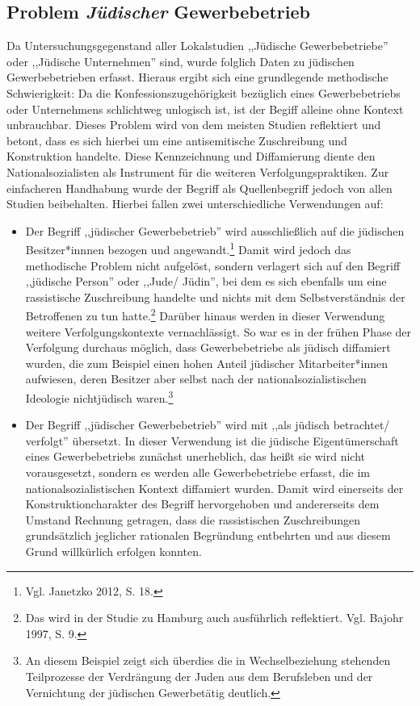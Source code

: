 \subsection{Problem \textit{Jüdischer} Gewerbebetrieb}

Da Untersuchungsgegenstand aller Lokalstudien ,,Jüdische Gewerbebetriebe'' oder ,,Jüdische Unternehmen'' sind, wurde folglich Daten zu jüdischen Gewerbebetrieben erfasst. Hieraus ergibt sich eine grundlegende methodische Schwierigkeit: Da die Konfessionszugehörigkeit bezüglich eines Gewerbebetriebs oder Unternehmens schlichtweg unlogisch ist, ist der Begiff alleine ohne Kontext unbrauchbar. Dieses Problem wird von dem meisten Studien reflektiert und betont, dass es sich hierbei um eine antisemitische Zuschreibung und Konstruktion handelte. Diese Kennzeichnung und Diffamierung diente den Nationalsozialisten als Instrument für die weiteren Verfolgungspraktiken. Zur einfacheren Handhabung wurde der Begriff als Quellenbegriff jedoch von allen Studien beibehalten. Hierbei fallen zwei unterschiedliche Verwendungen auf: 

\begin{itemize}
    \item Der Begriff ,,jüdischer Gewerbebetrieb'' wird ausschließlich auf die jüdischen Besitzer*innnen bezogen und angewandt.\footnote{Vgl. Janetzko 2012, S. 18.} Damit wird jedoch das methodische Problem nicht aufgelöst, sondern verlagert sich auf den Begriff ,,jüdische Person'' oder ,,Jude/ Jüdin'', bei dem es sich ebenfalls um eine rassistische Zuschreibung handelte und nichts mit dem Selbstverständnis der Betroffenen zu tun hatte.\footnote{Das wird in der Studie zu Hamburg auch ausführlich reflektiert. Vgl. Bajohr 1997, S. 9.} Darüber hinaus werden in dieser Verwendung weitere Verfolgungskontexte vernachlässigt. So war es in der frühen Phase der Verfolgung durchaus möglich, dass Gewerbebetriebe als jüdisch diffamiert wurden, die zum Beispiel einen hohen Anteil jüdischer Mitarbeiter*innen aufwiesen, deren Besitzer aber selbst nach der nationalsozialistischen Ideologie nichtjüdisch waren.\footnote{An diesem Beispiel zeigt sich überdies die in Wechselbeziehung stehenden Teilprozesse der Verdrängung der Juden aus dem Berufsleben und der Vernichtung der jüdischen Gewerbetätig deutlich.}
    \item Der Begriff ,,jüdischer Gewerbebetrieb'' wird mit ,,als jüdisch betrachtet/ verfolgt'' übersetzt. In dieser Verwendung ist die jüdische Eigentümerschaft eines Gewerbebetriebs zunächst unerheblich, das heißt sie wird nicht vorausgesetzt, sondern es werden alle Gewerbebetriebe erfasst, die im nationalsozialistischen Kontext diffamiert wurden. Damit wird einerseits der Konstruktioncharakter des Begriff hervorgehoben und andererseits dem Umstand Rechnung getragen, dass die rassistischen Zuschreibungen grundsätzlich jeglicher rationalen Begründung entbehrten und aus diesem Grund willkürlich erfolgen konnten.
\end{itemize}

